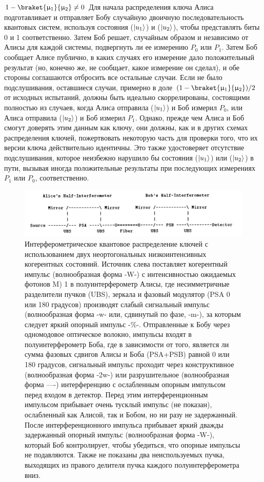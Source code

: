 $1 -\braket{\mu_1}{\mu_2}\neq 0$
Для начала распределения ключа Алиса подготавливает и отправляет Бобу случайную двоичную последовательность квантовых систем, используя состояния ($\lvert u_1\rangle$) и ($\lvert u_2\rangle$), чтобы представлять биты 0 и 1 соответственно. Затем Боб решает, случайным образом и независимо от Алисы для каждой системы, подвергнуть ли ее измерению $P_0$ или $P_1$. Затем Боб сообщает Алисе публично, в каких случаях его измерение дало положительный результат (но, конечно же, не сообщает, какое измерение он сделал), и обе стороны соглашаются отбросить все остальные случаи. Если не было подслушивания, оставшиеся случаи, примерно в доле $(1 -\braket{\mu_1}{\mu_2})/2$ от исходных испытаний, должны быть идеально скоррелированы, состоящими полностью из случаев, когда Алиса отправила ($\lvert u_1\rangle$) и Боб измерил $P_0$, или Алиса отправила ($\lvert u_2\rangle$) и Боб измерил $P_1$. Однако, прежде чем Алиса и Боб смогут доверять этим данным как ключу, они должны, как и в других схемах распределения ключей, пожертвовать некоторую часть для проверки того, что их версии ключа действительно идентичны. Это также удостоверяет отсутствие подслушивания, которое неизбежно нарушило бы состояния ($\lvert u_1\rangle$) или ($\lvert u_2\rangle$) в пути, вызывая иногда положительные результаты при последующих измерениях $P_1$ или $P_0$, соответственно.
\begin{figure}
    \centering
    \includegraphics[width=\textwidth]{images/B92 scheme from article.png}
    \caption{Интерферометрическое квантовое распределение ключей с использованием двух неортогональных низкоинтенсивных когерентных состояний. Источник слева поставляет когерентный импульс (волнообразная форма -W-) с интенсивностью ожидаемых фотонов M) 1 в полуинтерферометр Алисы, где несимметричные разделители пучков (UBS), зеркала и фазовый модулятор (PSA 0 или 180 градусов) производят слабый сигнальный импульс (волнообразная форма -w- или, сдвинутый по фазе, -m-), за которым следует яркий опорный импульс -\%-. Отправленные к Бобу через одномодовое оптическое волокно, импульсы входят в полуинтерферометр Боба, где в зависимости от того, является ли сумма фазовых сдвигов Алисы и Боба (PSA+PSB) равной 0 или 180 градусов, сигнальный импульс проходит через конструктивное (волнообразная форма -2w-) или разрушительное (волнообразная форма —-) интерференцию с ослабленным опорным импульсом перед входом в детектор. Перед этим интерференционным импульсом прибывает очень тусклый импульс (не показан), ослабленный как Алисой, так и Бобом, но ни разу не задержанный. После интерференционного импульса прибывает яркий дважды задержанный опорный импульс (волнообразная форма -W-), который Боб контролирует, чтобы убедиться, что опорные импульсы не подавляются. Также не показаны два неиспользуемых пучка, выходящих из правого делителя пучка  каждого полуинтерферометра вниз.}
    \label{fig:B92 sch lit}
\end{figure}
